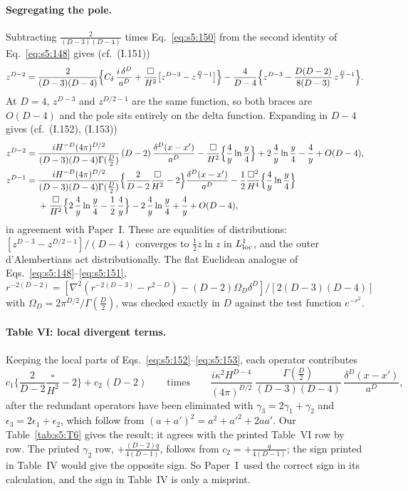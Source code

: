 \documentclass[aps,prd,onecolumn,10pt,nofootinbib,floatfix]{revtex4-2}
\newcommand{\PI}{Paper~I}
\newcommand{\eqI}[1]{(I.#1)}
\begin{document}
\paragraph*{Segregating the pole.}
Subtracting $\frac{2}{(D-3)(D-4)}$ times Eq.~\eqref{eq:s5:150} from the second identity of Eq.~\eqref{eq:s5:148} gives (cf.\ \eqI{151})
\begin{equation}
z^{D-2}=\frac{2}{(D-3)(D-4)}\Big\{C_{\delta}\,\frac{i\,\delta^D}{a^D}+\frac{\square}{H^2}\big[z^{D-3}-z^{\frac D2-1}\big]\Big\}
-\frac{4}{D-4}\Big\{z^{D-3}-\frac{D(D-2)}{8(D-3)}\,z^{\frac D2-1}\Big\}.
\label{eq:s5:151}
\end{equation}
At $D=4$, $z^{D-3}$ and $z^{D/2-1}$ are the same function, so both braces are $O(D-4)$ and the pole sits entirely on the delta function.
Expanding in $D-4$ gives (cf.\ \eqI{152}, \eqI{153})
\begin{align}
z^{D-2}={}&\frac{iH^{-D}(4\pi)^{D/2}}{(D-3)(D-4)\Gamma(\frac D2)}\,(D-2)\,\frac{\delta^D(x-x')}{a^D}
-\frac{\square}{H^2}\Big\{\frac4y\ln\frac y4\Big\}+2\,\frac4y\ln\frac y4-\frac4y+O(D-4),
\label{eq:s5:152}\\
z^{D-1}={}&\frac{iH^{-D}(4\pi)^{D/2}}{(D-3)(D-4)\Gamma(\frac D2)}\Big\{\frac{2}{D-2}\frac{\square}{H^2}-2\Big\}\frac{\delta^D(x-x')}{a^D}
-\frac12\frac{\square^2}{H^4}\Big\{\frac4y\ln\frac y4\Big\}\notag\\
&+\frac{\square}{H^2}\Big\{2\,\frac4y\ln\frac y4-\frac12\,\frac4y\Big\}-2\,\frac4y\ln\frac y4+\frac4y+O(D-4),
\label{eq:s5:153}
\end{align}
in agreement with \PI.
These are equalities of distributions: $[z^{D-3}-z^{D/2-1}]/(D-4)$ converges to $\frac12z\ln z$ in $L^1_{\rm loc}$, and the outer d'Alembertians act distributionally.
The flat Euclidean analogue of Eqs.~\eqref{eq:s5:148}--\eqref{eq:s5:151}, $r^{-2(D-2)}=[\nabla^2(r^{-2(D-3)}-r^{2-D})-(D-2)\Omega_D\delta^D]/[2(D-3)(D-4)]$ with $\Omega_D=2\pi^{D/2}/\Gamma(\frac D2)$, was checked exactly in $D$ against the test function $e^{-r^2}$.

\paragraph*{Table VI: local divergent terms.}
Keeping the local parts of Eqs.~\eqref{eq:s5:152}--\eqref{eq:s5:153}, each operator contributes
\begin{equation}
c_1\Big\{\frac{2}{D-2}\frac{\square}{H^2}-2\Big\}+c_2\,(D-2)
\qquad\text{times}\qquad
\frac{i\kappa^2H^{D-4}}{(4\pi)^{D/2}}\,\frac{\Gamma(\frac D2)}{(D-3)(D-4)}\,\frac{\delta^D(x-x')}{a^D},
\label{eq:s5:T6rule}
\end{equation}
after the redundant operators have been eliminated with $\gamma_3=2\gamma_1+\gamma_2$ and $\epsilon_3=2\epsilon_1+\epsilon_2$, which follow from $(a+a')^2=a^2+a'^2+2aa'$.
Our Table~\ref{tab:s5:T6} gives the result; it agrees with the printed Table~VI row by row.
The printed $\gamma_2$ row, $+\frac{(D-2)q}{4(D-1)}$, follows from $c_2=+\frac{q}{4(D-1)}$; the sign printed in Table~IV would give the opposite sign.
So \PI\ used the correct sign in its calculation, and the sign in Table~IV is only a misprint.
\end{document}
